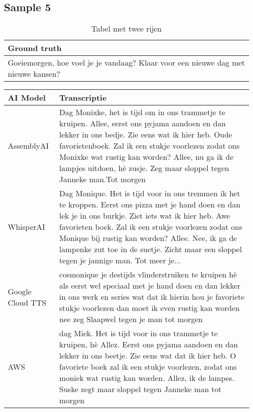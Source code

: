 \subsection{Sample 5}
\begin{table}[htbp]
    \centering
    \label{tab:groundtruth_sample5}
    \begin{tabularx}{\textwidth}{|X|}
        \hline
        \textbf{Ground truth} \\
        
        \hline
        Goeiemorgen, hoe voel je je vandaag? Klaar voor een nieuwe dag met nieuwe kansen? \\
        \hline
    \end{tabularx}
    \caption{Tabel met twee rijen}
\end{table}

\begin{table}[htbp]
    \centering
    \label{tab:results_sample5}
    \begin{tabularx}{\textwidth}{|l|X|}
    \hline
    \textbf{AI Model} & \textbf{Transcriptie} \\ \midrule
    
    AssemblyAI &    Dag Monixke, het is tijd om in ons trammetje te kruipen. Allee, eerst ons pyjama aandoen en dan lekker in ons bedje. Zie eens wat ik hier heb. Oude favorietenboek. Zal ik een stukje voorlezen zodat ons Monixke wat rustig kan worden? Allee, nu ga ik de lampjes uitdoen, hè zusje. Zeg maar sloppel tegen Janneke man.Tot morgen
    \\ \hline
    
    WhisperAI & Dag Monique. Het is tijd voor in ons tremmen ik het te kroppen. Eerst ons pizza met je hand doen en dan lek je in ons burkje. Ziet iets wat ik hier heb. Awe favorieten boek. Zal ik een stukje voorlezen zodat ons Monique bij rustig kan worden? Allee. Nee, ik ga de lampenke zut toe in de suetje. Zicht maar een sloppel tegen je jannige man. Tot meer je...
    \\ \hline
    
    Google Cloud TTS &         cosmonique je destijds vlinderstruiken te kruipen hè als eerst wel speciaal met je hand doen en dan lekker in ons werk en series wat dat ik hierin hou je favoriete stukje voorlezen dan moet ik even rustig kan worden nee zeg Slaapwel tegen je man tot morgen
    \\ \hline
    
    AWS &    dag Miek. Het is tijd voor in ons trammetje te kruipen, hè Allez. Eerst ons pyjama aandoen en dan lekker in ons beetje. Zie eens wat dat ik hier heb. O favoriete boek zal ik een stukje voorlezen, zodat ons moniek wat rustig kan worden. Allez, ik de lampes. Suske zegt maar sloppel tegen Janneke man tot morgen
    \\ \hline
    

\end{tabularx}
\end{table}
